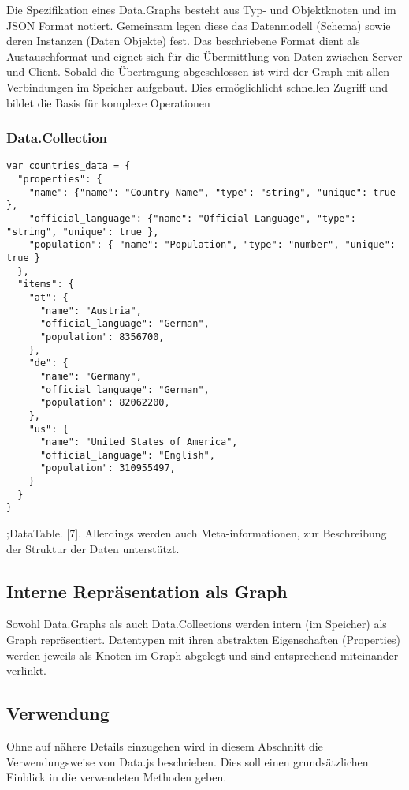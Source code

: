 \documentclass[runningheads]{llncs}
\begin{document}
Die Spezifikation eines Data.Graphs besteht aus Typ- und Objektknoten und im JSON Format notiert. Gemeinsam legen diese das Datenmodell (Schema) sowie deren Instanzen (Daten Objekte) fest. Das beschriebene Format dient als Austauschformat und eignet sich für die Übermittlung von Daten zwischen Server und Client. Sobald die Übertragung abgeschlossen ist wird der Graph mit allen Verbindungen im Speicher aufgebaut. Dies ermöglichlicht schnellen Zugriff und bildet die Basis für komplexe Operationen

\subsubsection{Data.Collection}
\begin{verbatim}
var countries_data = {
  "properties": {
    "name": {"name": "Country Name", "type": "string", "unique": true },
    "official_language": {"name": "Official Language", "type": "string", "unique": true },
    "population": { "name": "Population", "type": "number", "unique": true }
  },
  "items": {
    "at": {
      "name": "Austria",
      "official_language": "German",
      "population": 8356700,
    },
    "de": {
      "name": "Germany",
      "official_language": "German",
      "population": 82062200,
    },
    "us": {
      "name": "United States of America",
      "official_language": "English",
      "population": 310955497,
    }
  }
}
\end{verbatim}
;DataTable. [7]. Allerdings werden auch Meta-informationen, zur Beschreibung der Struktur der Daten unterstützt.

\subsection{Interne Repräsentation als Graph}


Sowohl Data.Graphs als auch Data.Collections werden intern (im Speicher) als Graph repräsentiert. Datentypen  mit ihren abstrakten Eigenschaften (Properties) werden jeweils als Knoten im Graph abgelegt und sind entsprechend miteinander verlinkt.

\subsection{Verwendung}


Ohne auf nähere Details einzugehen wird in diesem Abschnitt die Verwendungsweise von Data.js beschrieben. Dies soll einen grundsätzlichen Einblick in die verwendeten Methoden geben.
\end{document}
